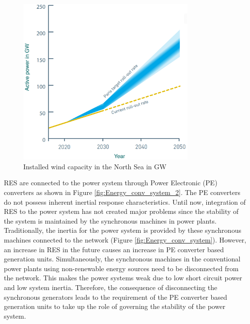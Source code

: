 \begin{figure}[H]
\centering
    \includegraphics[height = 8.5cm,width = 9cm]{Diagrams/Chapter_1/Paris.pdf}
    \caption{Installed wind capacity in the North Sea in GW \cite{noauthor_vision_2020}}
    \label{fig:Paris_roll_out}
\end{figure}

\gls{RES} are connected to the power system through Power Electronic (\gls{PE}) converters as shown in Figure \ref{fig:Energy_conv_system_2}. The \gls{PE} converters do not possess inherent inertial response characteristics. Until now, integration of \gls{RES} to the power system has not created major problems since the stability of the system is maintained by the synchronous machines in power plants. Traditionally, the inertia for the power system is provided by these synchronous machines connected to the network (Figure \ref{fig:Energy_conv_system}). However, an increase in \gls{RES} in the future causes an increase in \gls{PE} converter based generation units. Simultaneously, the synchronous machines in the conventional power plants using non-renewable energy sources need to be disconnected from the network. This makes the power systems weak due to low short circuit power and low system inertia. Therefore, the consequence of disconnecting the synchronous generators leads to the requirement of the \gls{PE} converter based generation units to take up the role of governing the stability of the power system.

